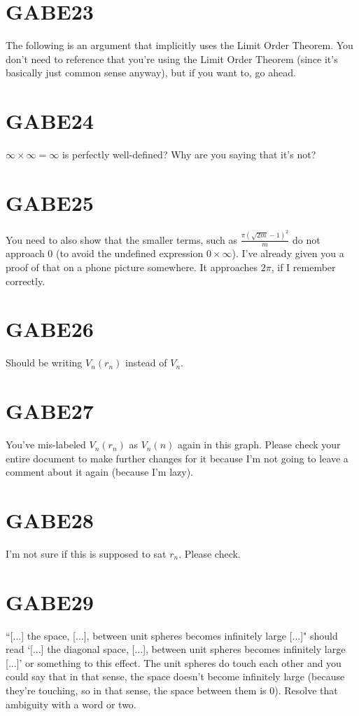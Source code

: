 \section{GABE23}
The following is an argument that implicitly uses the Limit Order Theorem. You don't need to reference that you're using the Limit Order Theorem (since it's basically just common sense anyway), but if you want to, go ahead.

\section{GABE24}
$\infty \times \infty = \infty$ is perfectly well-defined? Why are you saying that it's not?

\section{GABE25}
You need to also show that the smaller terms, such as $\frac{\pi (\sqrt{2m} - 1)^2}{m}$ do not approach $0$ (to avoid the undefined expression $0\times \infty$). I've already given you a proof of that on a phone picture somewhere. It approaches $2\pi$, if I remember correctly.

\section{GABE26}
Should be writing $V_{n} (r_{n} )$ instead of $V_n$.

\section{GABE27}
You've mis-labeled $V_{n} (r_n)$ as $V_{n} (n)$ again in this graph. Please check your entire document to make further changes for it because I'm not going to leave a comment about it again (because I'm lazy).

\section{GABE28}
I'm not sure if this is supposed to sat $r_n$. Please check.

\section{GABE29}
``[...] the space, [...], between unit spheres becomes infinitely large [...]" should read `[...] the diagonal space, [...], between unit spheres becomes infinitely large [...]' or something to this effect. The unit spheres do touch each other and you could say that in that sense, the space doesn't become infinitely large (because they're touching, so in that sense, the space between them is 0). Resolve that ambiguity with a word or two.

